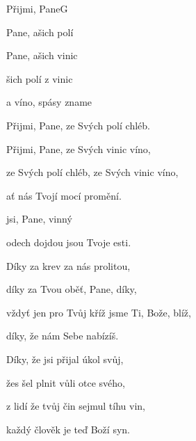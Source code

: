 \begin{song}{Přijmi, Pane}{G}{}

\begin{SBVerse}

 Pane, ašich polí  

 Pane, ašich vinic 

šich polí  z  vinic 

 a víno, spásy zname

\end{SBVerse}

\begin{SBVerse}

Přijmi, Pane, ze Svých polí chléb. 

Přijmi, Pane, ze Svých vinic víno, 

ze Svých polí chléb, ze Svých vinic víno, 

ať nás Tvojí mocí promění.

\end{SBVerse}

\begin{SBChorus}

 jsi, Pane,   vinný  

odech dojdou   jsou Tvoje esti.

\end{SBChorus}

\begin{SBVerse}

Díky za krev za nás prolitou, 

díky za Tvou oběť, Pane, díky,

vždyť jen pro Tvůj kříž jsme Ti, Bože, blíž,

díky, že nám Sebe nabízíš.

\end{SBVerse}

\begin{SBVerse}

Díky, že jsi přijal úkol svůj,

žes šel plnit vůli otce svého,

z lidí že tvůj čin sejmul tíhu vin,

každý člověk je teď Boží syn.

\end{SBVerse}

\end{song}

\pagebreak
